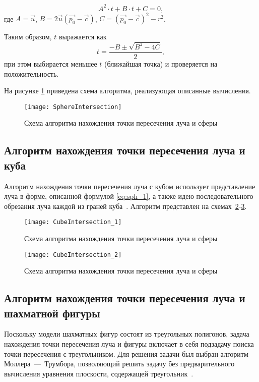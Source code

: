 \begin{equation}
	A^2\cdot t + B\cdot t + C = 0,
\end{equation}
где $A = \vec{u}$, $B = 2\vec{u}(\vec{p_0} - \vec{c})$, $C = (\vec{p_0} - \vec{c})^2 - r^2$.

Таким образом, $t$ выражается как 
\begin{equation}
	t = \frac{-B \pm \sqrt{B^2-4C}}{2}, 
\end{equation}
при этом выбирается меньшее $t$ (ближайшая точка) и проверяется на положительность.

На рисунке \ref{fig:RaySphere} приведена схема алгоритма, реализующая описанные вычисления.

\begin{figure}[H]
	\centering
	\texttt{[image: SphereIntersection]}
	\caption{Схема алгоритма нахождения точки пересечения луча и сферы}
	\label{fig:RaySphere}
\end{figure}

\subsection{Алгоритм нахождения точки пересечения луча и куба}
Алгоритм нахождения точки пересечения луча с кубом использует представление луча в форме, описанной формулой \ref{eq:sph_1}, а также идею последовательного обрезания луча каждой из граней куба~\cite{lit7}.
Алгоритм представлен на схемах~\ref{fig:CubeIntersection_1}-\ref{fig:CubeIntersection_2}.
\begin{figure}[H]
	\centering
	\texttt{[image: CubeIntersection\_1]}
	\caption{Схема алгоритма нахождения точки пересечения луча и сферы}
	\label{fig:CubeIntersection_1}
\end{figure}

\begin{figure}[H]
	\centering
	\texttt{[image: CubeIntersection\_2]}
	\caption{Схема алгоритма нахождения точки пересечения луча и сферы}
	\label{fig:CubeIntersection_2}
\end{figure}

\subsection{Алгоритм нахождения точки пересечения луча и шахматной фигуры}
Поскольку модели шахматных фигур состоят из треугольных полигонов, задача нахождения точки пересечения луча и фигуры включает в себя подзадачу поиска точки пересечения с треугольником. Для решения задачи был выбран алгоритм Моллера~---~Трумбора, позволяющий решить задачу без предварительного вычисления уравнения плоскости, содержащей треугольник~\cite{lit8}.

